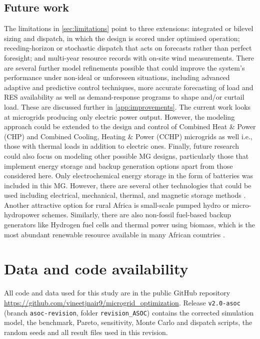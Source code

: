 \documentclass[final,3p,times]{elsarticle}
\begin{document}
\subsection{Future work \label{sec:future}}

The limitations in \cref{sec:limitations} point to three extensions: integrated or bilevel sizing and dispatch, in which the design is scored under optimised operation; receding-horizon or stochastic dispatch that acts on forecasts rather than perfect foresight; and multi-year resource records with on-site wind measurements. There are several further model refinements possible that could improve the system's performance under non-ideal or unforeseen situations, including advanced adaptive and predictive control techniques, more accurate forecasting of load and RES availability as well as demand-response programs to shape and/or curtail load. These are discussed further in \cref{app:improvements}. The current work looks at microgrids producing only electric power output. However, the modeling approach could be extended to the design and control of Combined Heat \& Power (CHP) and Combined Cooling, Heating \& Power (CCHP) microgrids as well i.e., those with thermal loads in addition to electric ones. Finally, future research could also focus on modeling other possible MG designs, particularly those that implement energy storage and backup generation options apart from those considered here. Only electrochemical energy storage in the form of batteries was included in this MG. However, there are several other technologies that could be used including electrical, mechanical, thermal, and magnetic storage methods \cite{ESS_control}. Another attractive option for rural Africa is small-scale pumped hydro or micro-hydropower schemes. Similarly, there are also non-fossil fuel-based backup generators like Hydrogen fuel cells and thermal power using biomass, which is the most abundant renewable resource available in many African countries \cite{usea}.

\section{Data and code availability}

All code and data used for this study are in the public GitHub repository \url{https://github.com/vineetjnair9/microgrid_optimization}. Release \texttt{v2.0-asoc} (branch \texttt{asoc-revision}, folder \texttt{revision\_ASOC}) contains the corrected simulation model, the benchmark, Pareto, sensitivity, Monte Carlo and dispatch scripts, the random seeds and all result files used in this revision.
\end{document}
